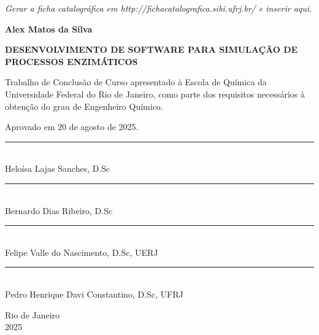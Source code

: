 \documentclass[12pt,oneside]{report}
\begin{document}
\newpage
{}
\vspace*{\fill}
\begin{center}
    \textit{Gerar a ficha catalográfica em http://fichacatalografica.sibi.ufrj.br/ e inserir aqui.}
\end{center}
\vspace*{\fill}
\newpage

\begin{center}
    \textbf{Alex Matos da Silva}

    \vspace{1cm}

    \textbf{DESENVOLVIMENTO DE SOFTWARE PARA SIMULAÇÃO DE PROCESSOS ENZIMÁTICOS}

    \vspace{0.5cm}

    \begin{adjustwidth}{8cm}{0cm}
        Trabalho de Conclusão de Curso apresentado à Escola de Química da Universidade Federal do Rio de Janeiro, como parte dos requisitos necessários à obtenção do grau de Engenheiro Químico.
    \end{adjustwidth}

    \vspace{0.5cm}

\end{center}

Aprovado em 20 de agosto de 2025.

\begin{center}

    \vspace{2cm}

    \noindent\rule{10cm}{0.4pt}\\
    \noindent\hspace*{0.2cm}Heloísa Lajas Sanches, D.Sc

    \vspace{1cm}

    \noindent\rule{10cm}{0.4pt}\\
    \noindent\hspace*{0.2cm}Bernardo Dias Ribeiro, D.Sc

    \vspace{2cm}

    \noindent\rule{10cm}{0.4pt}\\
    \noindent\hspace*{0.2cm}Felipe Valle do Nascimento, D.Sc, UERJ

    \vspace{1cm}

    \noindent\rule{10cm}{0.4pt}\\
    \noindent\hspace*{0.2cm}Pedro Henrique Davi Constantino, D.Sc, UFRJ


    \vfill

    Rio de Janeiro \\
    2025
\end{center}
\newpage
\end{document}
